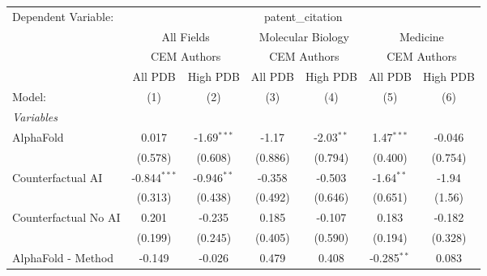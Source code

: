 \begingroup
\centering
\begin{tabular}{lcccccc}
   \tabularnewline \midrule \midrule
   Dependent Variable: & \multicolumn{6}{c}{patent\_citation}\\
 & \multicolumn{2}{c}{All Fields} & \multicolumn{2}{c}{Molecular Biology} & \multicolumn{2}{c}{Medicine} \\
\cmidrule(lr){2-3} \cmidrule(lr){4-5} \cmidrule(lr){6-7}
 & \multicolumn{2}{c}{CEM Authors} & \multicolumn{2}{c}{CEM Authors} & \multicolumn{2}{c}{CEM Authors} \\
\cmidrule(lr){2-3} \cmidrule(lr){4-5} \cmidrule(lr){6-7}
 & \multicolumn{1}{c}{All PDB} & \multicolumn{1}{c}{High PDB} & \multicolumn{1}{c}{All PDB} & \multicolumn{1}{c}{High PDB} & \multicolumn{1}{c}{All PDB} & \multicolumn{1}{c}{High PDB} \\
\cmidrule(lr){2-2} \cmidrule(lr){3-3} \cmidrule(lr){4-4} \cmidrule(lr){5-5} \cmidrule(lr){6-6} \cmidrule(lr){7-7}
   Model:                                                     & (1)            & (2)           & (3)           & (4)           & (5)           & (6)\\  
   \midrule
   \emph{Variables}\\
   AlphaFold                                                  & 0.017          & -1.69$^{***}$ & -1.17         & -2.03$^{**}$  & 1.47$^{***}$  & -0.046\\   
                                                              & (0.578)        & (0.608)       & (0.886)       & (0.794)       & (0.400)       & (0.754)\\   
   Counterfactual AI                                          & -0.844$^{***}$ & -0.946$^{**}$ & -0.358        & -0.503        & -1.64$^{**}$  & -1.94\\   
                                                              & (0.313)        & (0.438)       & (0.492)       & (0.646)       & (0.651)       & (1.56)\\   
   Counterfactual No AI                                       & 0.201          & -0.235        & 0.185         & -0.107        & 0.183         & -0.182\\   
                                                              & (0.199)        & (0.245)       & (0.405)       & (0.590)       & (0.194)       & (0.328)\\   
   AlphaFold - Method                                         & -0.149         & -0.026        & 0.479         & 0.408         & -0.285$^{**}$ & 0.083\\   

\end{tabular}
